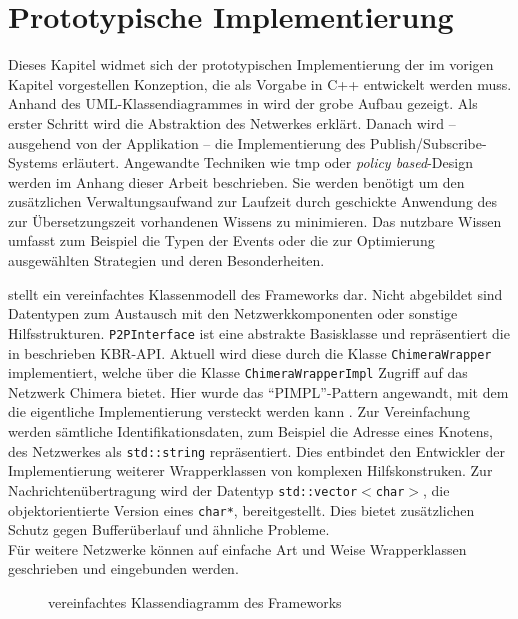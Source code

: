 \chapter{Prototypische Implementierung}
\label{chap:impl}
Dieses Kapitel widmet sich der prototypischen Implementierung der im vorigen Kapitel vorgestellen Konzeption, die als Vorgabe in C++ entwickelt werden muss. Anhand des UML-Klassendiagrammes in  wird der grobe Aufbau gezeigt. Als erster Schritt wird die Abstraktion des Netwerkes erklärt. Danach wird -- ausgehend von der Applikation -- die Implementierung des Publish/Subscribe-Systems erläutert. Angewandte Techniken wie \ac{tmp} oder \emph{policy based}-Design werden im Anhang dieser Arbeit beschrieben. Sie werden benötigt um den zusätzlichen Verwaltungsaufwand zur Laufzeit durch geschickte Anwendung des zur Übersetzungszeit vorhandenen Wissens zu minimieren. Das nutzbare Wissen umfasst zum Beispiel die Typen der Events oder die zur Optimierung ausgewählten Strategien und deren Besonderheiten.

 stellt ein vereinfachtes Klassenmodell des Frameworks dar. Nicht abgebildet sind Datentypen zum Austausch mit den Netzwerkkomponenten oder sonstige Hilfsstrukturen. \texttt{P2PInterface} ist eine abstrakte Basisklasse und repräsentiert die in \cite{Dabek2003Towards} beschrieben KBR-API. Aktuell wird diese durch die Klasse \texttt{ChimeraWrapper} implementiert, welche über die Klasse \texttt{ChimeraWrapperImpl} Zugriff auf das Netzwerk Chimera bietet. Hier wurde das ``PIMPL''-Pattern angewandt, mit dem die eigentliche Implementierung versteckt werden kann \cite{Alexandrescu2001Modern}. Zur Vereinfachung werden sämtliche Identifikationsdaten, zum Beispiel die Adresse eines Knotens, des Netzwerkes als \texttt{std::string} repräsentiert. Dies entbindet den Entwickler der Implementierung weiterer Wrapperklassen von komplexen Hilfskonstruken. Zur Nachrichtenübertragung wird der Datentyp \texttt{std::vector$<$char$>$}, die objektorientierte Version eines \texttt{char*}, bereitgestellt. Dies bietet zusätzlichen Schutz gegen Bufferüberlauf und ähnliche Probleme.\\
Für weitere Netzwerke können auf einfache Art und Weise Wrapperklassen geschrieben und eingebunden werden.

\begin{figure}[htbp]
\centering
{}
\caption{vereinfachtes Klassendiagramm des Frameworks}
\label{fig:uml}
\end{figure}

